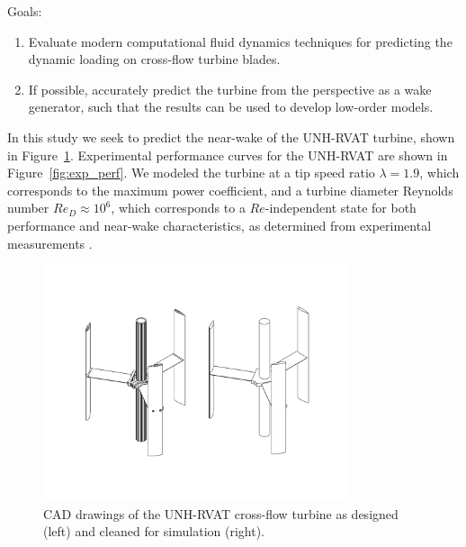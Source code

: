 \documentclass[aip,graphicx]{revtex4-1}
\begin{document}
Goals:

\begin{enumerate}

    \item Evaluate modern computational fluid dynamics techniques for predicting
    the dynamic loading on cross-flow turbine blades.

    \item If possible, accurately predict the turbine from the perspective as a
    wake generator, such that the results can be used to develop low-order
    models.

\end{enumerate}


In this study we seek to predict the near-wake of the UNH-RVAT turbine, shown in
Figure~\ref{fig:RVAT-CAD}. Experimental performance curves for the UNH-RVAT are
shown in Figure~\ref{fig:exp_perf}. We modeled the turbine at a tip speed ratio
$\lambda=1.9$, which corresponds to the maximum power coefficient, and a turbine
diameter Reynolds number $Re_D \approx 10^6$, which corresponds to a
$Re$-independent state for both performance and near-wake characteristics, as
determined from experimental measurements \cite{Bachant2014,
    Bachant2015-RVAT-Re-dep}.


\begin{figure}[ht]
    \centering
    
    \includegraphics[clip, trim=0 1in 0 1in, width=0.8\textwidth]{figures/CAD}
    
    \caption{CAD drawings of the UNH-RVAT cross-flow turbine as designed (left)
        and cleaned for simulation (right).}
    
    \label{fig:RVAT-CAD}
\end{figure}
\end{document}
